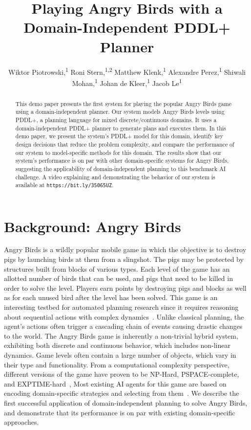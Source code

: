 \documentclass[letterpaper]{article} %
\title{Playing Angry Birds with a Domain-Independent PDDL+ Planner}
\author{
Wiktor Piotrowski,\textsuperscript{\rm 1}
Roni Stern,\textsuperscript{\rm 1,2}
Matthew Klenk,\textsuperscript{\rm 1}
Alexandre Perez,\textsuperscript{\rm 1}
Shiwali Mohan,\textsuperscript{\rm 1}
Johan de Kleer,\textsuperscript{\rm 1}
Jacob Le\textsuperscript{\rm 1}
\\
}
\begin{document}
\maketitle

\begin{abstract}
This demo paper presents the first system for playing  the popular Angry Birds game using a domain-independent planner.
Our system models Angry Birds levels using PDDL+, a planning language for mixed discrete/continuous domains. It uses a domain-independent PDDL+ planner to generate plans and executes them.
In this demo paper, we present the system's PDDL+ model for this domain, identify key design decisions that reduce the problem complexity, and compare the performance of our system to model-specific methods for this domain. The results show that our system's performance is on par with other domain-specific systems for Angry Birds, suggesting the applicability of domain-independent planning to this benchmark AI challenge.
A video explaining and demonstrating the behavior of our system is available at \texttt{https://bit.ly/35065UZ}.
\end{abstract}




\section{Background: Angry Birds}
Angry Birds is a wildly popular mobile game in which the objective is to destroy pigs by launching birds at them from a slingshot. The pigs may be protected by structures built from blocks of various types. Each level of the game has an allotted number of birds that can be used, and pigs that need to be killed in order to solve the level.
Players earn points by destroying pigs and blocks as well as for each unused bird after the level has been solved.
This game is an interesting testbed for automated planning research since it
requires reasoning about sequential actions with complex dynamics~\cite{renz2019ai}.
Unlike classical planning, the agent's actions often trigger a cascading chain of events causing drastic changes to the world.
The Angry Birds game is inherently a non-trivial hybrid system, exhibiting both discrete and continuous behavior, which includes non-linear dynamics.
Game levels often contain a large number of objects, which vary in their type and functionality.
From a computational complexity perspective, different versions of the game have proven to be NP-Hard, PSPACE-complete, and EXPTIME-hard~\cite{stephenson2020computational},
Most existing AI agents for this game are based on encoding domain-specific strategies and selecting from them~\cite{borovicka2014datalab,wang2017description}.
We describe the first successful application of domain-independent planning to solve Angry Birds,
and demonstrate that its performance is on par with existing domain-specific approaches.
\end{document}
